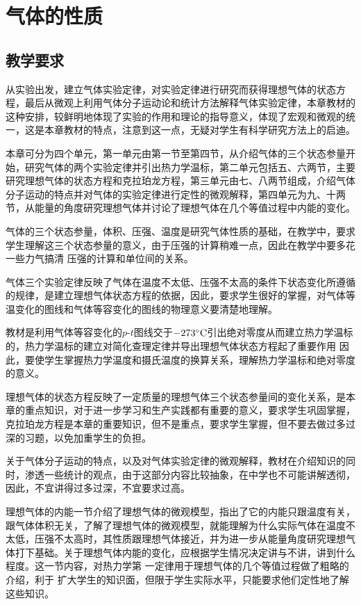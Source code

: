 
\chapter{气体的性质}\minitoc[n]
\section{教学要求}
从实验出发，建立气体实验定律，对实验定律进行研究而获得理想气体的状态方程，最后从微观上利用气体分子运动论和统计方法解释气体实验定律，本章教材的这种安排，较鲜明地体现了实验的作用和理论的指导意义，体现了宏观和微观的统一，这是本章教材的特点，注意到这一点，无疑对学生有科学研究方法上的启迪。

本章可分为四个单元，第一单元由第一节至第四节，从介绍气体的三个状态参量开始，研究气体的两个实验定律并引出热力学温标，第二单元包括五、六两节，主要研究理想气体的状态方程和克拉珀龙方程，第三单元由七、八两节组成，介绍气体分子运动的特点并对气体的实验定律进行定性的微观解释，第四单元为九、十两节，从能量的角度研究理想气体并讨论了理想气体在几个等值过程中内能的变化。

气体的三个状态参量，体积、压强、温度是研究气体性质的基础，在教学中，要求学生理解这三个状态参量的意义，由于压强的计算稍难一点，因此在教学中要多花一些力气搞清
压强的计算和单位间的关系。

气体三个实验定律反映了气体在温度不太低、压强不太高的条件下状态变化所遵循的规律，是建立理想气体状态方程的依据，因此，要求学生很好的掌握，对气体等温变化的图线和气体等容变化的图线的物理意义要清楚地理解。

教材是利用气体等容变化的$p$-$t$图线交于${\rm -273^{\circ}C}$引出绝对零度从而建立热力学温标的，热力学温标的建立对简化查理定律并导出理想气体状态方程起了重要作用 因此，要使学生掌握热力学温度和摄氏温度的换算关系，理解热力学温标和绝对零度的意义。

理想气体的状态方程反映了一定质量的理想气体三个状态参量间的变化关系，是本章的重点知识，对于进一步学习和生产实践都有重要的意义，要求学生巩固掌握，克拉珀龙方程是本章的重要知识，但不是重点，要求学生掌握，但不要去做过多过深的习题，以免加重学生的负担。

关于气体分子运动的特点，以及对气体实验定律的微观解释，教材在介绍知识的同时，渗透一些统计的观点，由于这部分内容比较抽象，在中学也不可能讲解透彻，因此，不宜讲得过多过深，不宜要求过高。

理想气体的内能一节介绍了理想气体的微观模型，指出了它的内能只跟温度有关，跟气体体积无关，了解了理想气体的微观模型，就能理解为什么实际气体在温度不太低，压强不太高时，其性质跟理想气体接近，并为进一步从能量角度研究理想气体打下基础。关于理想气体内能的变化，应根据学生情况决定讲与不讲，讲到什么程度。这一节内容，对热力学第
一定律用于理想气体的几个等值过程做了粗略的介绍，利于
扩大学生的知识面，但限于学生实际水平，只能要求他们定性地了解这些知识。

